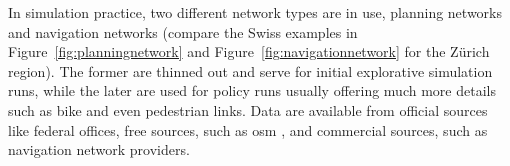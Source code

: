 {}
%
In simulation practice, two different network types are in use, planning networks and navigation networks (compare the Swiss examples in Figure~\ref{fig:planningnetwork} and Figure~\ref{fig:navigationnetwork} for the Zürich region). The former are thinned out and serve for initial explorative simulation runs, while the later are used for policy runs usually offering much more details such as bike and even pedestrian links. Data are available from official sources like federal offices, free sources, such as \gls{osm} \citep[][]{OpenStreetMap_Webpage_2015}, and commercial sources, such as navigation network providers.
%

%
%
%
%
%
%
%
